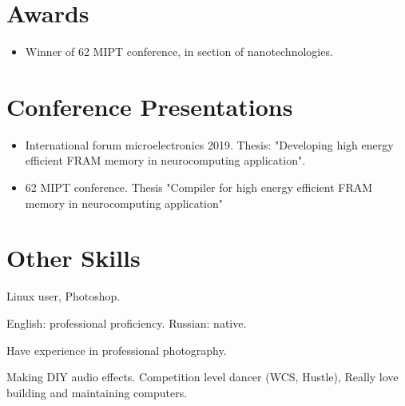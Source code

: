 \documentclass{article}
\begin{document}
\section{Awards}
\begin{itemize}
\item Winner of 62 MIPT conference, in section of nanotechnologies.
\end{itemize}
 
\section{Conference Presentations }
 
\begin{itemize}
\item International forum microelectronics 2019. Thesis: "Developing high energy efficient FRAM memory in neurocomputing application".
\item 62 MIPT conference. Thesis "Compiler for high energy efficient FRAM memory in neurocomputing application"
\end{itemize}
 
 
 
 
\section{Other Skills}
\begin{description}[widest=Langauges]
\item[Software] Linux user, Photoshop.
\item[Languages] English: professional proficiency.  Russian: native.
\item[Photography] Have experience in professional photography.
\item[Hobbies] Making DIY audio effects. Competition level dancer (WCS, Hustle), Really love building and maintaining computers.
\end{description}
 
\end{document}
